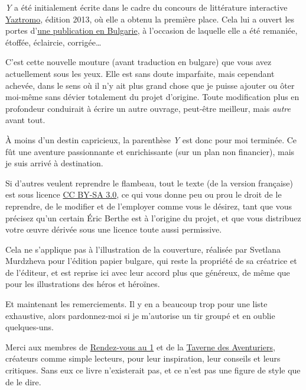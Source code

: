 \documentclass{report}
\begin{document}
\emph{Y} a été initialement écrite dans le cadre du concours de littérature interactive \href{http://litteraction.fr/presentation/livre-dont-on-est-le-heros/concours-yaztromo}{Yaztromo}, édition 2013, où elle a obtenu la première place. Cela lui a ouvert les portes d'\href{http://knigi-igri.bg/articles-reviews/articles-news/item/140-ochakvaite-geroi-na-erik-bert/140-ochakvaite-geroi-na-erik-bert}{une publication en Bulgarie}, à l'occasion de laquelle elle a été remaniée, étoffée, éclaircie, corrigée\dots

C'est cette nouvelle mouture (avant traduction en bulgare) que vous avez actuellement sous les yeux. Elle est sans doute imparfaite, mais cependant achevée, dans le sens où il n'y ait plus grand chose que je puisse ajouter ou ôter moi-même sans dévier totalement du projet d'origine. Toute modification plus en profondeur conduirait à écrire un autre ouvrage, peut-être meilleur, mais \emph{autre} avant tout.

À moins d'un destin capricieux, la parenthèse \emph{Y} est donc pour moi terminée. Ce fût une aventure passionnante et enrichissante (sur un plan non financier), mais je suis arrivé à destination.

Si d'autres veulent reprendre le flambeau, tout le texte (de la version française) est sous licence \href{http://creativecommons.org/licenses/by-sa/3.0/fr/}{CC BY-SA 3.0}, ce qui vous donne peu ou prou le droit de le reprendre, de le modifier et de l'employer comme vous le désirez, tant que vous précisez qu'un certain Éric Berthe est à l'origine du projet, et que vous distribuez votre œuvre dérivée sous une licence toute aussi permissive.

Cela ne s'applique pas à l'illustration de la couverture, réalisée par Svetlana Murdzheva pour l'édition papier bulgare, qui reste la propriété de sa créatrice et de l'éditeur, et est reprise ici avec leur accord plus que généreux, de même que pour les illustrations des héros et héroïnes.

Et maintenant les remerciements. Il y en a beaucoup trop pour une liste exhaustive, alors pardonnez-moi si je m'autorise un tir groupé et en oublie quelques-uns.

Merci aux membres de \href{http://rdv1.dnsalias.net/forum/}{Rendez-vous au 1} et de la \href{http://www.la-taverne-des-aventuriers.com/forum}{Taverne des Aventuriers}, créateurs comme simple lecteurs, pour leur inspiration, leur conseils et leurs critiques. Sans eux ce livre n'existerait pas, et ce n'est pas une figure de style que de le dire.
\end{document}
